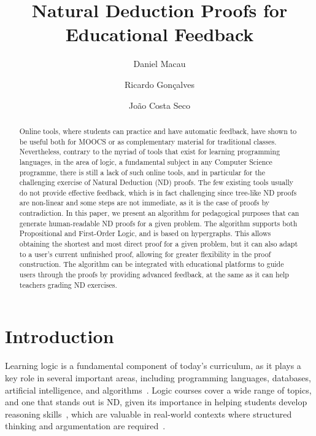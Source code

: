 \documentclass[runningheads]{llncs}
\begin{document}
\title{Natural Deduction Proofs for Educational Feedback}

\author{Daniel Macau
\and Ricardo Gonçalves
\and João Costa Seco}


\maketitle 

\begin{abstract}
Online tools, where students can practice and have automatic feedback, have shown to be useful both for MOOCS or as complementary material for traditional classes. Nevertheless, contrary to the myriad of tools that exist for learning programming languages, in the area of logic, a fundamental subject in any Computer Science programme, there is still a lack of such online tools, and in particular for the challenging exercise of Natural Deduction (ND) proofs. The few existing tools usually do not provide effective feedback, which is in fact challenging since tree-like ND proofs are non-linear and some steps are not immediate, as it is the case of proofs by contradiction. In this paper, we present an algorithm for pedagogical purposes that can generate human-readable ND proofs for a given problem. The algorithm supports both Propositional and First-Order Logic, and is based on hypergraphs. This allows obtaining the shortest and most direct proof for a given problem, but it can also adapt to a user’s current unfinished proof, allowing for greater flexibility in the proof construction. The algorithm can be integrated with educational platforms to guide users through the proofs by providing advanced feedback, at the same as it can help teachers grading ND exercises. 

\end{abstract}

\section{Introduction}
Learning logic is a fundamental component of today’s curriculum, as it plays a key role in several important areas, including programming languages, databases, artificial intelligence, and algorithms~\cite{logicincomputer}. Logic courses cover a wide range of topics, and one that stands out is ND, given its importance in helping students develop reasoning skills~\cite{autogeneratingnd}, which are valuable in real-world contexts where structured thinking and argumentation are required~\cite{vonPlato_2014}.
\end{document}
